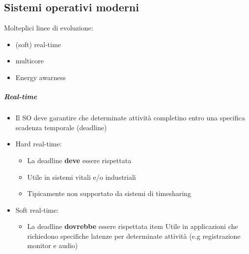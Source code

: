 \subsection{Sistemi operativi moderni}
Molteplici linee di evoluzione:
\begin{itemize}
\item (soft) real-time
\item multicore
\item Energy awarness
\end{itemize}
\subparagraph{Real-time}
\begin{itemize}
\item Il SO deve garantire che determinate attività completino entro una specifica scadenza temporale (deadline)
\item Hard real-time:
 \begin{itemize}
 \item La deadline \textbf{deve} essere rispettata
 \item Utile in sistemi vitali e/o industriali
 \item Tipicamente non supportato da sistemi di timesharing
 \end{itemize}
\item Soft real-time:
 \begin{itemize}
 \item La deadline \textbf{dovrebbe} essere rispettata
 item Utile in applicazioni che richiedono specifiche latenze per determinate attività (e.g registrazione monitor e audio)
 \end{itemize}
\end{itemize}
